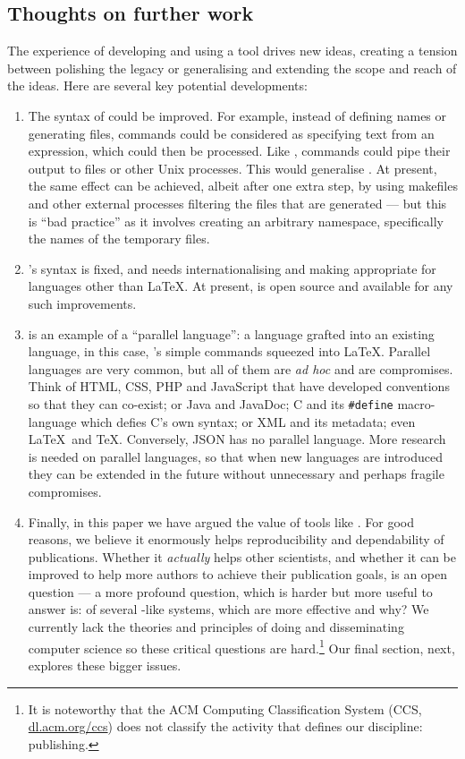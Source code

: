 \documentclass[prodmode,acmtecs]{acmsmall} %
\begin{document}
\subsection{Thoughts on further work}
The experience of developing and using a tool drives new ideas, creating a tension between polishing the legacy or generalising and extending the scope and reach of the ideas. Here are several key potential developments:

\begin{enumerate}\raggedright
\item
The syntax of  could be improved. For example, instead of defining names or generating files,  commands could be considered as specifying text from an expression, which could then be processed. Like , commands could pipe their output to files or other Unix processes. This would generalise . At present, the same effect can be achieved, albeit after one extra step, by using makefiles and other external processes filtering the files that are generated --- but this is ``bad practice'' as it involves creating an arbitrary namespace, specifically the names of the temporary files.

\item
{}'s syntax is fixed, and needs internationalising and making appropriate for  languages other than \LaTeX\@. At present,  is open source and available for any such improvements.

\item
{} is an example of a ``parallel language'': a language grafted into an existing language, in this case, 's simple commands squeezed into \LaTeX. Parallel languages are very common, but all of them are \emph{ad hoc\/} and are compromises. Think of HTML, CSS, PHP and JavaScript that have developed conventions so that they can co-exist; or Java and JavaDoc; C and its \texttt{\#define} macro-language which defies C's own syntax; or XML and its metadata; even \LaTeX\ and \TeX\@. Conversely, JSON has no parallel language.  More research is needed on parallel languages, so that when new languages are introduced they can be extended in the future without unnecessary and perhaps fragile compromises.
\item
Finally, in this paper we have argued the value of tools like . For good reasons, we believe it enormously helps reproducibility and dependability of publications. Whether it \emph{actually\/} helps other scientists, and whether it can be improved to help more authors to achieve their publication goals, is an open question --- a more profound question, which is harder but more useful to answer is: of several -like systems, which are more effective and why? We currently lack the theories and principles of doing and disseminating computer science so these critical questions are hard.\footnote{It is noteworthy that the ACM Computing Classification System (CCS, \url{dl.acm.org/ccs}) does not classify the activity that defines our discipline: publishing.} Our final section, next, explores these bigger issues. 
\end{enumerate}
\end{document}
